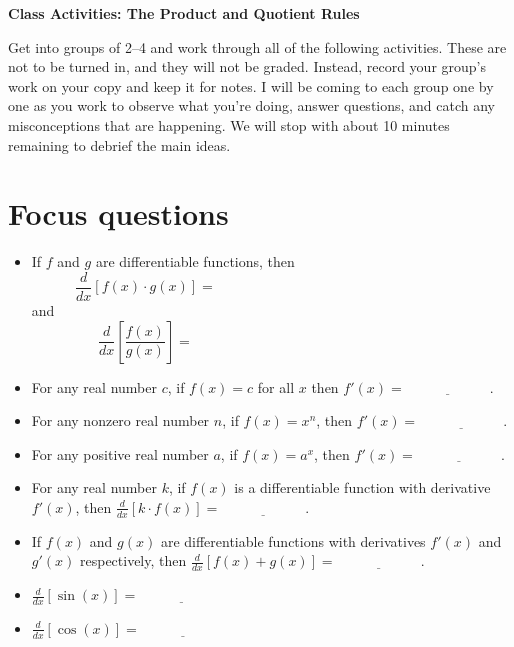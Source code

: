 \documentclass[11pt]{article}
\begin{document}
	
	\thispagestyle{empty}
	\renewcommand{\headrulewidth}{0.0pt}
	\thispagestyle{fancy}
	\lfoot{}
	\cfoot{}
	\rfoot{}	
	
	\vspace*{0in}

		\begin{center}
			\begin{large}
			\textbf{Class Activities: The Product and Quotient Rules} \\
			\end{large}
		\end{center}
	
Get into groups of 2--4 and work through all of the following activities. These are not to be turned in, and they will not be graded. Instead, record your group's work on your copy and keep it for notes. I will be coming to each group one by one as you work to observe what you're doing, answer questions, and catch any misconceptions that are happening. We will stop with about 10 minutes remaining to debrief the main ideas. \\

\section{Focus questions}

\begin{itemize}
	\item If $f$ and $g$ are differentiable functions, then 
	\[ \frac{d}{dx}\left[ f(x) \cdot g(x) \right] = \hspace{3in} \]
	and 
	\[ \frac{d}{dx}\left[ \frac{f(x)}{g(x)} \right] = \hspace{3in} \]
	\item For any real number $c$, if $f(x) = c$ for all $x$ then $f'(x) = \underline{\hspace{1in}}$. 
	\item For any nonzero real number $n$, if $f(x) = x^n$, then $f'(x) = \underline{\hspace{1in}}$. 
	\item For any positive real number $a$, if $f(x) = a^x$, then $f'(x) = \underline{\hspace{1in}}$.
	\item For any real number $k$, if $f(x)$ is a differentiable function with derivative $f'(x)$, then $\frac{d}{dx}[k \cdot f(x) ] = \underline{\hspace{1in}}$. 
	\item If $f(x)$ and $g(x)$ are differentiable functions with derivatives $f'(x)$ and $g'(x)$ respectively, then $\frac{d}{dx}[f(x) + g(x)] = \underline{\hspace{1in}}$. 
	\item $\frac{d}{dx}[\sin(x)] = \underline{\hspace{1in}}$
	\item $\frac{d}{dx}[\cos(x)] = \underline{\hspace{1in}}$
\end{itemize}
\end{document}
